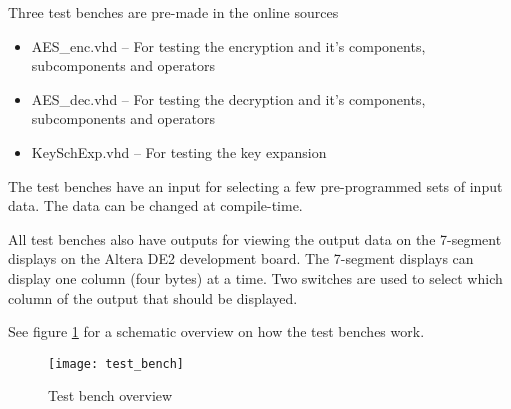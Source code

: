 \documentclass[report.tex]{subfiles}
\begin{document}
Three test benches are pre-made in the online sources
\begin{itemize}
\item AES\_enc.vhd -- For testing the encryption and it's components, subcomponents and operators
\item AES\_dec.vhd -- For testing the decryption and it's components, subcomponents and operators
\item KeySchExp.vhd -- For testing the key expansion
\end{itemize}

The test benches have an input for selecting a few pre-programmed sets of input data. The data can be changed at compile-time. 

All test benches also have outputs for viewing the output data on the 7-segment displays on the Altera DE2 development board. The 7-segment displays can display one column (four bytes) at a time. Two switches are used to select which column of the output that should be displayed.

See figure \ref{fig:test bench overview} for a schematic overview on how the test benches work.

\begin{figure}[ht]
\centering
\texttt{[image: test\_bench]}
\caption{Test bench overview}
\label{fig:test bench overview}
\end{figure}
\end{document}
